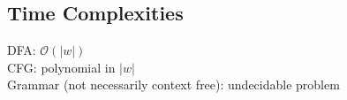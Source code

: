 \subsection{Time Complexities}
DFA: $\mathcal{O}(|w|)$\\
CFG: polynomial in $|w|$\\
Grammar (not necessarily context free): undecidable problem\\